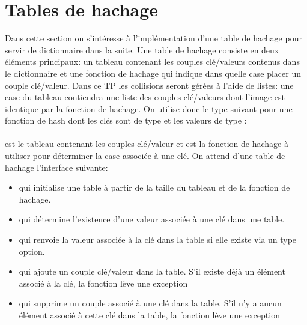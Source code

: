 \documentclass[a4paper, 10pt]{article}
\begin{document}
\section{Tables de hachage}
Dans cette section on s'intéresse à l'implémentation d'une table de hachage pour servir de dictionnaire dans la suite.
Une table de hachage consiste en deux éléments principaux: un tableau contenant les couples clé/valeurs contenus dans le dictionnaire et une fonction de hachage qui indique dans quelle case placer un couple clé/valeur.
Dans ce TP les collisions seront gérées à l'aide de listes: une case du tableau contiendra une liste des couples clé/valeurs dont l'image est identique par la fonction de hachage.
On utilise donc le type suivant pour une fonction de hash dont les clés sont de type  et les valeurs de type :\\
\\
 est le tableau contenant les couples clé/valeur et   est la fonction de hachage à utiliser pour déterminer la case associée à une clé.
On attend d'une table de hachage l'interface suivante:
\begin{itemize}
\item {} qui initialise une table à partir de la taille du tableau et de la fonction de hachage.
\item {} qui détermine l'existence d'une valeur associée à une clé dans une table.
\item {} qui renvoie la valeur associée à la clé dans la table si elle existe via un type option.
\item {} qui ajoute un couple clé/valeur dans la table. S'il existe déjà un élément associé à la clé, la fonction lève une exception
\item {} qui supprime un couple associé à une clé dans la table. S'il n'y a aucun élément associé à cette clé dans la table, la fonction lève une exception
\end{itemize}
\end{document}
